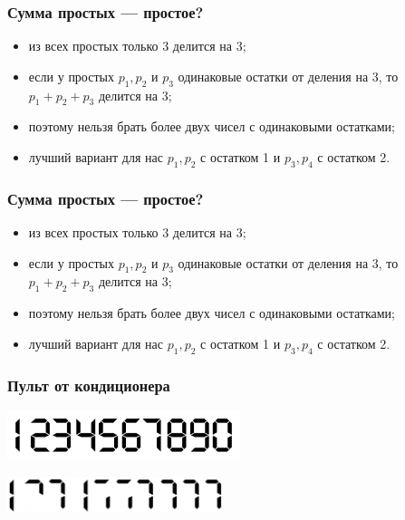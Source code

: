 \documentclass[aspectratio=1610,12pt,notheorems]{beamer}
\begin{document}
\begin{frame} \frametitle{Сумма простых — простое?}

\begin{itemize}
	\item из всех простых только 3 делится на 3;
	\item если у простых $p_1, p_2$ и $p_3$ одинаковые остатки от деления на 3, то $p_1+p_2+p_3$ делится на 3;
	\item поэтому нельзя брать более двух чисел с одинаковыми остатками;
	\item лучший вариант для нас $p_1, p_2$ с остатком 1 и $p_3, p_4$ с остатком 2.
\end{itemize}

\end{frame}

\begin{frame} \frametitle{Сумма простых — простое?}

\begin{itemize}
	\item из всех простых только 3 делится на 3;
	\item если у простых $p_1, p_2$ и $p_3$ одинаковые остатки от деления на 3, то $p_1+p_2+p_3$ делится на 3;
	\item поэтому нельзя брать более двух чисел с одинаковыми остатками;
	\item лучший вариант для нас $p_1, p_2$ с остатком 1 и $p_3, p_4$ с остатком 2.
\end{itemize}

\end{frame}

\begin{frame} \frametitle{Пульт от кондиционера}
\begin{center} \includegraphics[width=6.8cm]{img/Digiface} \end{center}


\begin{center} \includegraphics[width=6.3cm]{img/Digiface-A} \end{center}
\end{frame}
\end{document}

